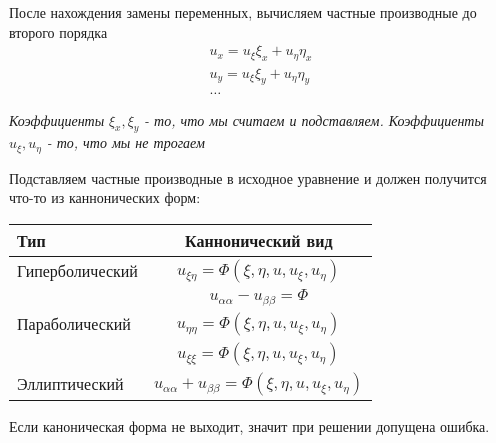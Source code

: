\documentclass{article}[12pt]
\begin{document}
\par После нахождения замены переменных, вычисляем частные производные
до второго порядка
\begin{eqnarray*}
    u_{x}=u_{\xi}\xi_{x}+u_{\eta}\eta_{x}\\
    u_{y}=u_{\xi}\xi_{y}+u_{\eta}\eta_{y}\\
    \ldots
\end{eqnarray*}
\par \textit{Коэффициенты} $\xi_{x},\xi_{y}$ \textit{- то, что мы
считаем и подставляем. Коэффициенты} $u_{\xi},u_{\eta}$ \textit{- то,
что мы не трогаем}
\par Подставляем частные производные в исходное уравнение и должен
получится что-то из каннонических форм:
\begin{center}
\begin{tabular}{ |l|c| }
    Тип & Каннонический вид \\
    \hline
    Гиперболический & $u_{\xi\eta}=\Phi(\xi,\eta,u,u_{\xi},u_{\eta})$ \\
                    & $u_{\alpha\alpha}-u_{\beta\beta}=\Phi$\\
    \hline
    Параболический & $u_{\eta\eta}=\Phi(\xi,\eta,u,u_{\xi},u_{\eta})$\\
                   & $u_{\xi\xi}=\Phi(\xi,\eta,u,u_{\xi},u_{\eta})$\\
    \hline
    Эллиптический & $u_{\alpha\alpha}+u_{\beta\beta}
                        =\Phi(\xi,\eta,u,u_{\xi},u_{\eta})$ \\
    \hline
\end{tabular}
\end{center}

Если каноническая форма не выходит, значит при решении допущена
ошибка.
\end{document}

